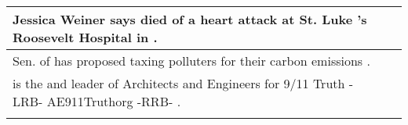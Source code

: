 \begin{longtable}{p{} P{1,4cm} }
\hline
{} {Jessica Weiner says \underline{} died of a heart attack at St. Luke 's Roosevelt Hospital in \underline{} .} &    \\ 
\hline
{} {Sen. \underline{} of \underline{} has proposed taxing polluters for their carbon emissions .} &    \\ 
\hline
{} {\underline{} is the \underline{} and leader of Architects and Engineers for 9/11 Truth -LRB- AE911Truthorg -RRB- .} &    \\ 
\hline
\fi

\label{table02:tacred}
\end{longtable} 